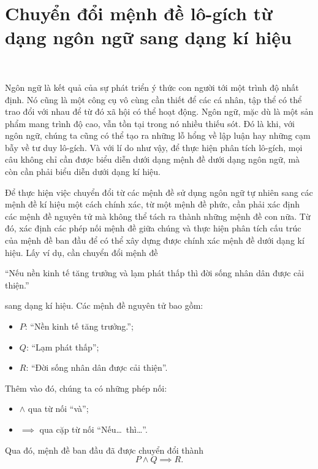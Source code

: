 \section{Chuyển đổi mệnh đề lô-gích từ dạng ngôn ngữ sang dạng kí hiệu}

\ %

Ngôn ngữ là kết quả của sự phát triển ý thức con người tới một trình độ nhất định. Nó cũng là một công cụ vô cùng cần thiết để các cá nhân, tập thể có thể trao đổi với nhau để từ đó xã hội có thể hoạt động. Ngôn ngữ, mặc dù là một sản phẩm mang trình độ cao, vẫn tồn tại trong nó nhiều thiếu sót. Đó là khi, với ngôn ngữ, chúng ta cũng có thể tạo ra những lỗ hổng về lập luận hay những cạm bẫy về tư duy lô-gích. Và với lí do như vậy, để thực hiện phân tích lô-gích, mọi câu không chỉ cần được biểu diễn dưới dạng mệnh đề dưới dạng ngôn ngữ, mà còn cần phải biểu diễn dưới dạng kí hiệu.

Để thực hiện việc chuyển đổi từ các mệnh đề sử dụng ngôn ngữ tự nhiên sang các mệnh đề kí hiệu một cách chính xác, từ một mệnh đề phức, cần phải xác định các mệnh đề nguyên tử mà không thể tách ra thành những mệnh đề con nữa. Từ đó, xác định các phép nối mệnh đề giữa chúng và thực hiện phân tích cấu trúc của mệnh đề ban đầu để có thể xây dựng được chính xác mệnh đề dưới dạng kí hiệu. Lấy ví dụ, cần chuyển đổi mệnh đề
\begin{center}
    ``Nếu nền kinh tế tăng trưởng và lạm phát thấp thì đời sống nhân dân được cải thiện.''    
\end{center}
sang dạng kí hiệu. Các mệnh đề nguyên tử bao gồm:
\begin{itemize}
    \item $P$: ``Nền kinh tế tăng trưởng.'';
    \item $Q$: ``Lạm phát thấp'';
    \item $R$: ``Đời sống nhân dân được cải thiện''.
\end{itemize}
Thêm vào đó, chúng ta có những phép nối:
\begin{itemize}
    \item $\land$ qua từ nối ``và'';
    \item $\implies$ qua cặp từ nối ``Nếu\dots\ thì\dots''.
\end{itemize}
Qua đó, mệnh đề ban đầu đã được chuyển đổi thành
$$
P \land Q \implies R.
$$

